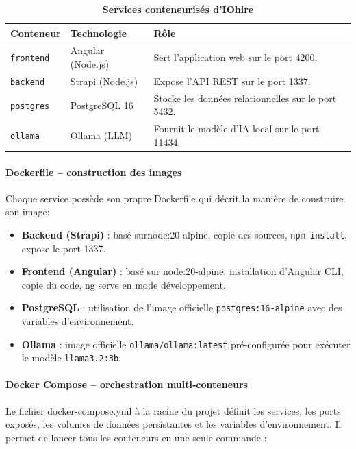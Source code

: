 \documentclass[12pt,a4paper,oneside]{report}
\begin{document}
\begin{itemize}
\begin{table}[H]
\centering
\caption{ \textbf{Services conteneurisés d’IOhire} }\label{tab:containers} 
\vspace{0.5cm}
\begin{tabular}{|l|l|l|}
\hline
\textbf{Conteneur} & \textbf{Technologie} & \textbf{Rôle} \\ \hline
\texttt{frontend} & Angular (Node.js) & Sert l’application web sur le port 4200. \\ \hline
\texttt{backend} & Strapi (Node.js) & Expose l’API REST sur le port 1337. \\ \hline
\texttt{postgres} & PostgreSQL 16 & Stocke les données relationnelles sur le port 5432. \\ \hline
\texttt{ollama} & Ollama (LLM) & Fournit le modèle d’IA local sur le port 11434. \\ \hline
\end{tabular}

\end{table}

\paragraph{Dockerfile – construction des images}
Chaque service possède son propre Dockerfile qui décrit la manière de construire son image:
\begin{itemize}
    \item \textbf{Backend (Strapi)} : basé surnode:20-alpine, copie des sources, \texttt{npm install}, expose le port 1337.
    \item \textbf{Frontend (Angular)} : basé sur node:20-alpine, installation d’Angular CLI, copie du code, ng serve en mode développement.
    \item \textbf{PostgreSQL} : utilisation de l’image officielle \texttt{postgres:16-alpine} avec des variables d’environnement.
    \item \textbf{Ollama} : image officielle \texttt{ollama/ollama:latest} pré‑configurée pour exécuter le modèle \texttt{llama3.2:3b}.
\end{itemize}

\paragraph{Docker Compose – orchestration multi‑conteneurs}
Le fichier docker-compose.yml à la racine du projet définit les services, les ports exposés, les volumes de données persistantes et les variables d’environnement. Il permet de lancer tous les conteneurs en une seule commande :


\end{itemize}
\end{document}
